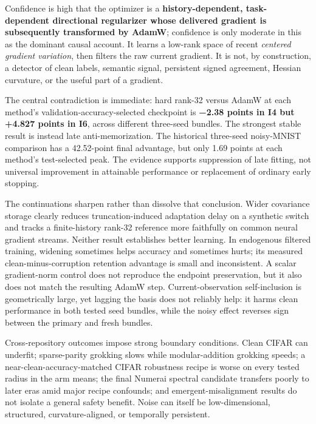 \documentclass[
  british,
  10pt,
  a4paper,
]{article}
\begin{document}
Confidence is high that the optimizer is a
\textbf{history-\allowbreak{}dependent,\allowbreak{}
task-\allowbreak{}dependent directional regularizer whose delivered
gradient is subsequently transformed by AdamW}; confidence is only
moderate in this as the dominant causal account. It learns a low-rank
space of recent \emph{centered gradient variation}, then filters the raw
current gradient. It is not, by construction\allowbreak{},\allowbreak{}
a detector of clean labels, semantic signal, persistent signed
agreement, Hessian curvature, or the useful part of a gradient.

The central contradiction is immediate: hard rank-32 versus AdamW at
each method's validation-\allowbreak{}accuracy-\allowbreak{}selected
checkpoint is \textbf{−2.38 points in I4 but +4.827 points in I6},
across different three-seed bundles. The strongest stable result is
instead late anti-\allowbreak{}memorization\allowbreak{}.\allowbreak{}
The historical three-seed noisy-\allowbreak{}MNIST comparison has a
42.\allowbreak{}52-\allowbreak{}point final advantage, but only 1.69
points at each method's test-\allowbreak{}selected peak. The evidence
supports suppression of late fitting, not universal improvement in
attainable performance or replacement of ordinary early stopping.

The continuations sharpen rather than dissolve that
conclusion.\allowbreak{} Wider covariance storage clearly reduces
truncation-\allowbreak{}induced adaptation delay on a synthetic switch
and tracks a finite-\allowbreak{}history rank-32 reference more
faithfully on common neural gradient streams. Neither result establishes
better learning. In endogenous filtered training, widening sometimes
helps accuracy and sometimes hurts; its measured
clean-\allowbreak{}minus-\allowbreak{}corruption retention advantage is
small and inconsistent\allowbreak{}.\allowbreak{} A scalar
gradient-\allowbreak{}norm control does not reproduce the endpoint
preservation\allowbreak{},\allowbreak{} but it also does not match the
resulting AdamW step. Current-\allowbreak{}observation
self-\allowbreak{}inclusion is geometrically large, yet lagging the
basis does not reliably help: it harms clean performance in both tested
seed bundles, while the noisy effect reverses sign between the primary
and fresh bundles.

Cross-\allowbreak{}repository outcomes impose strong boundary
conditions.\allowbreak{} Clean CIFAR can underfit;
sparse-\allowbreak{}parity grokking slows while
modular-\allowbreak{}addition grokking speeds; a
near-\allowbreak{}clean-\allowbreak{}accuracy-\allowbreak{}matched CIFAR
robustness recipe is worse on every tested radius in the arm means; the
final Numerai spectral candidate transfers poorly to later eras amid
major recipe confounds; and
emergent-\allowbreak{}misalignment\allowbreak{} results do not isolate a
general safety benefit. Noise can itself be
low-\allowbreak{}dimensional,\allowbreak{} structured,\allowbreak{}
curvature-\allowbreak{}aligned,\allowbreak{} or temporally
persistent.\allowbreak{}
\end{document}
